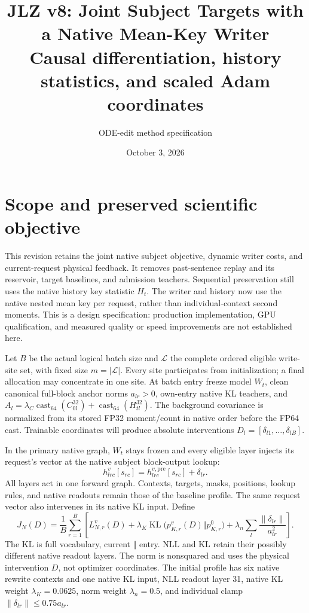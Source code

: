 \documentclass[10pt]{article}
\title{JLZ v8: Joint Subject Targets with a Native Mean-Key Writer\\
\large Causal differentiation, history statistics, and scaled Adam coordinates}
\author{ODE-edit method specification}
\date{October 3, 2026}
\newcommand{\KL}{\operatorname{KL}}
\newcommand{\norm}[1]{\left\lVert#1\right\rVert}
\begin{document}
\maketitle
\vspace{-1.5em}

\section{Scope and preserved scientific objective}
This revision retains the joint native subject objective, dynamic writer
costs, and current-request physical feedback. It removes past-sentence
replay and its reservoir, target baselines, and admission teachers.
Sequential preservation still uses the native history key statistic
$H_t$. The writer and history now use the native nested mean key per
request, rather than individual-context second moments. This is a design
specification: production implementation, GPU qualification, and measured
quality or speed improvements are not established here.

Let $B$ be the actual logical batch size and $\mathcal L$ the complete
ordered eligible write-site set, with fixed size $m=|\mathcal L|$.
Every site participates from initialization; a final allocation may
concentrate in one site. At batch entry freeze model $W_t$, clean
canonical full-block anchor norms $a_{lr}>0$, own-entry native KL
teachers, and $A_l=\lambda_C\operatorname{cast}_{64}(C_{0l}^{32})
+\operatorname{cast}_{64}(H_{tl}^{32})$. The background covariance is
normalized from its stored FP32 moment/count in native order before
the FP64 cast. Trainable coordinates will
produce absolute interventions $D_l=[\delta_{l1},\ldots,\delta_{lB}]$.

In the primary native graph, $W_t$ stays frozen and every eligible layer
injects its request's vector at the native subject block-output lookup:
\[
 h^v_{lrc}[s_{rc}]=h^{v,\mathrm{pre}}_{lrc}[s_{rc}]+\delta_{lr}.
\]
All layers act in one forward graph. Contexts, targets, masks, positions,
lookup rules, and native readouts remain those of the baseline profile.
The same request vector also intervenes in its native KL input. Define
\[
 J_N(D)=\frac1B\sum_{r=1}^{B}\left[
 L^v_{N,r}(D)+\lambda_K\KL\bigl(p^v_{K,r}(D)\Vert p^0_{K,r}\bigr)
 +\lambda_n\sum_l\frac{\norm{\delta_{lr}}}{a_{lr}^2}\right].
 \label{eq:native}
\]
The KL is full vocabulary, current $\Vert$ entry. NLL and KL retain
their possibly different native readout layers. The norm is nonsquared
and uses the physical intervention $D$, not optimizer coordinates.
The initial profile has six native rewrite contexts and one native KL
input, NLL readout layer 31, native KL weight
$\lambda_K=0.0625$, norm weight $\lambda_n=0.5$, and individual clamp
$\norm{\delta_{lr}}\leq0.75a_{lr}$.
\end{document}
